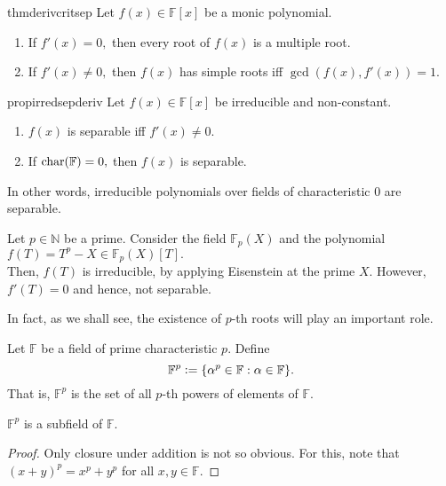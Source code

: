 \begin{restatable}{thm}{derivcritsep}
\label{thm:derivcritsep}
    Let $f(x) \in \mathbb{F}[x]$ be a monic polynomial.
    \begin{enumerate}
         \item If $f'(x) = 0,$ then every root of $f(x)$ is a multiple root.
         \item If $f'(x) \neq 0,$ then $f(x)$ has simple roots iff $\gcd(f(x), f'(x)) = 1.$ \hfill\hyperref[thm:derivcritsep2]{\downsym}
     \end{enumerate} 
\end{restatable}

\begin{restatable}[]{prop}{irredsepderiv}
\label{prop:irredsepderiv}
    Let $f(x) \in \mathbb{F}[x]$ be irreducible and non-constant.
    \begin{enumerate}
         \item $f(x)$ is separable iff $f'(x) \neq 0.$
         \item If $\operatorname{char}(\mathbb{F}) = 0,$ then $f(x)$ is separable. 
     \end{enumerate} 
     In other words, irreducible polynomials over fields of characteristic $0$ are separable. \hfill\hyperref[prop:irredsepderiv2]{\downsym}
\end{restatable}

\begin{ex}
    Let $p \in \mathbb{N}$ be a prime. Consider the field $\mathbb{F}_p(X)$ and the polynomial $f(T) = T^p - X \in \mathbb{F}_p(X)[T].$ \\
    Then, $f(T)$ is irreducible, by applying Eisenstein at the prime $X.$ However, $f'(T) = 0$ and hence, not separable.

    In fact, as we shall see, the existence of $p$-th roots will play an important role.
\end{ex}

\begin{defn}%
    Let $\mathbb{F}$ be a field of prime characteristic $p.$ Define
    \begin{equation*} 
        \mathbb{F}^p \vcentcolon= \{\alpha^p \in \mathbb{F} : \alpha \in \mathbb{F}\}.
    \end{equation*}
    That is, $\mathbb{F}^p$ is the set of all $p$-th powers of elements of $\mathbb{F}.$
\end{defn}

\begin{prop}
    $\mathbb{F}^p$ is a subfield of $\mathbb{F}.$
\end{prop}
\begin{proof} 
    Only closure under addition is not so obvious. For this, note that $(x + y)^p = x^p + y^p$ for all $x, y \in \mathbb{F}.$
\end{proof}

